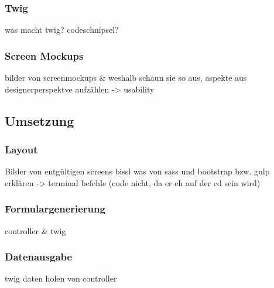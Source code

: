     \subsubsection{Twig}

was macht twig? codeschnipsel?

    \subsubsection{Screen Mockups}

bilder von screenmockups & weshalb schaun sie so aus, aspekte aus designerperspektve aufzählen -> usability

  \subsection{Umsetzung}

    \subsubsection{Layout}

Bilder von entgültigen screens
bissl was von sass und bootstrap bzw. gulp erklären -> terminal befehle (code nicht, da er eh auf der cd sein wird)

    \subsubsection{Formulargenerierung}

controller & twig

    \subsubsection{Datenausgabe}

twig daten holen von controller 
